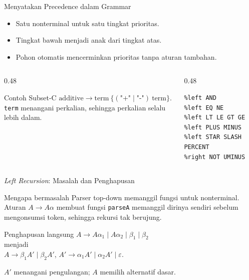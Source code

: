 \documentclass[aspectratio=169,10pt,t]{beamer}
\begin{document}
\begin{frame}[fragile]{Menyatakan Precedence dalam Grammar}
  \begin{itemize}
    \item Satu nonterminal untuk satu tingkat prioritas.
    \item Tingkat bawah menjadi anak dari tingkat atas.
    \item Pohon otomatis mencerminkan prioritas tanpa aturan tambahan.
  \end{itemize}

  \vspace{2pt}
  \begin{columns}[T,onlytextwidth]
    \begin{column}{0.48\textwidth}
      \begin{block}{Contoh Subset-C}
        \footnotesize
        \(\text{additive} \to \text{term}\ \{(\texttt{"+"} \mid
        \texttt{"-"})\ \text{term}\}\).\\
        \texttt{term} menangani perkalian, sehingga perkalian selalu
        lebih dalam.
      \end{block}
    \end{column}
    \begin{column}{0.48\textwidth}
      \begin{lstlisting}[language=Bison,numbers=none,
        caption={Deklarasi precedence pada Bison}]
%left OR
%left AND
%left EQ NE
%left LT LE GT GE
%left PLUS MINUS
%left STAR SLASH PERCENT
%right NOT UMINUS
      \end{lstlisting}
    \end{column}
  \end{columns}
\end{frame}

\begin{frame}{\textit{Left Recursion}: Masalah dan Penghapusan}
  \begin{block}{Mengapa bermasalah}
    \small
    Parser top-down memanggil fungsi untuk nonterminal. Aturan
    \(A \to A\alpha\) membuat fungsi \texttt{parseA} memanggil dirinya
    sendiri sebelum mengonsumsi token, sehingga rekursi tak berujung.
  \end{block}

  \begin{block}{Penghapusan langsung}
    \small
    \(A \to A\alpha_1 \mid A\alpha_2 \mid \beta_1 \mid \beta_2\)\\
    menjadi\\
    \(A \to \beta_1 A' \mid \beta_2 A'\),\quad
    \(A' \to \alpha_1 A' \mid \alpha_2 A' \mid \varepsilon\).
  \end{block}

  \vspace{2pt}
  {\footnotesize \(A'\) menangani pengulangan; \(A\) memilih
  alternatif dasar.}
\end{frame}
\end{document}
